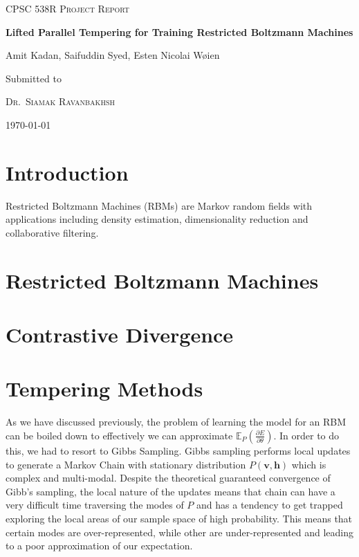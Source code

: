 \documentclass[12pt]{article}
\newcommand{\E}{{\mathbb{E}}}
\begin{document}
\begin{titlepage}
	\centering
	
	{\scshape \Large CPSC 538R Project Report
\par}
	\vspace{1cm}
	{\huge\bfseries Lifted Parallel Tempering for Training Restricted Boltzmann Machines
\par}
	\vspace{0.5cm}
	{\Large  Amit Kadan, Saifuddin Syed, Esten Nicolai W{\o}ien
\par}

	\vfill
	Submitted to\par
	{\scshape Dr.~Siamak Ravanbakhsh}\\
		{ \today\par}



\end{titlepage}

\tableofcontents
\newpage

\section{Introduction}
Restricted Boltzmann Machines (RBMs) are Markov random fields with applications including density estimation, 
dimensionality reduction and collaborative filtering.

\section{Restricted Boltzmann Machines}


\section{Contrastive Divergence}

\section{Tempering Methods}
%

As we have discussed previously, the problem of learning the model for an RBM can be boiled down to effectively we can approximate $\E_P\left(\frac{\partial E}{\partial \theta}\right)$. In order to do this, we had to resort to Gibbs Sampling. 
Gibbs sampling performs local updates to generate a Markov Chain with stationary distribution $P(\textbf{v},\textbf{h})$ which is complex and multi-modal. Despite the theoretical guaranteed convergence of Gibb's sampling, the local nature of the updates means that chain can have a very difficult time traversing the modes of $P$ and  has a tendency to get trapped exploring the local areas of our sample space of high probability. This means that certain modes are over-represented, while other are under-represented and leading to a poor approximation of our expectation.
\end{document}
